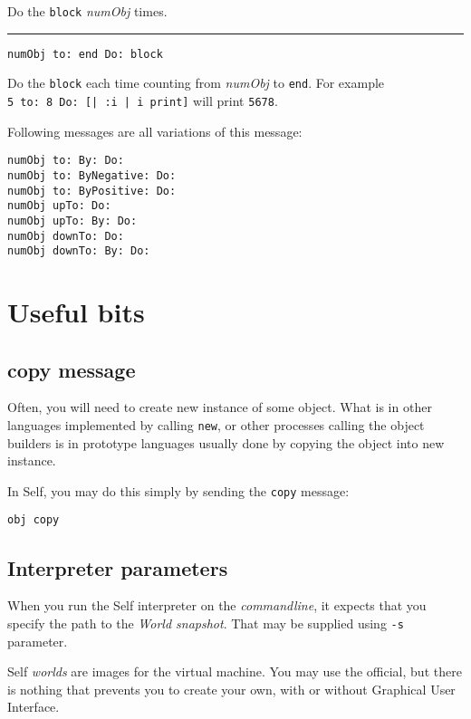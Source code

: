 \documentclass[10pt]{article}
\begin{document}
\begin{multicols*}{3}
Do the \texttt{block} \textit{numObj} times.

\vspace*{0.2cm}
\hrule

\begin{lstlisting}
numObj to: end Do: block
\end{lstlisting}

Do the \texttt{block} each time counting from \textit{numObj} to \texttt{end}. For example \texttt{5\ to:\ 8\ Do:\ [|\ :i\ |\ i\ print]} will print \texttt{5678}.

Following messages are all variations of this message:

\begin{lstlisting}
numObj to: By: Do:
numObj to: ByNegative: Do:
numObj to: ByPositive: Do:
numObj upTo: Do:
numObj upTo: By: Do:
numObj downTo: Do:
numObj downTo: By: Do:
\end{lstlisting}




\section{Useful bits}
\subsection{copy message}
Often, you will need to create new instance of some object. What is in other languages implemented by calling \texttt{new}, or other processes calling the object builders is in prototype languages usually done by copying the object into new instance.

In Self, you may do this simply by sending the \texttt{copy} message:

\begin{lstlisting}
obj copy
\end{lstlisting}



\subsection{Interpreter parameters}
When you run the Self interpreter on the \textit{commandline}, it expects that you specify the path to the \textit{World snapshot}. That may be supplied using \texttt{-s} parameter.

Self \textit{worlds} are images for the virtual machine. You may use the official, but there is nothing that prevents you to create your own, with or without Graphical User Interface.




\end{multicols*}
\end{document}
